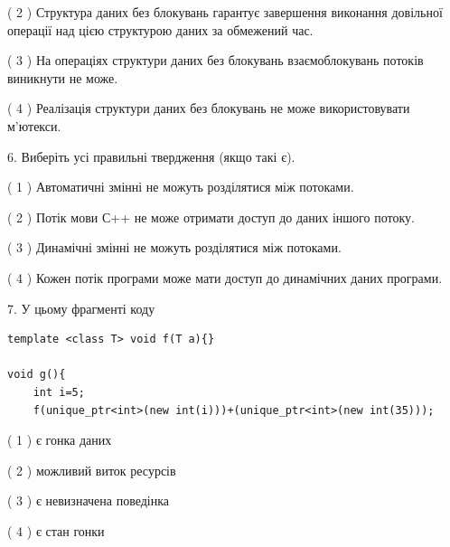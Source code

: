 \documentclass[12pt, ukrainian]{article}
\begin{document}
\begin {large}
{( 2 ) Структура даних без блокувань гарантує завершення виконання довільної операції над цією структурою даних за обмежений час.%

( 3 ) На операціях структури даних без блокувань взаємоблокувань потоків виникнути не може.%

( 4 ) Реалізація структури даних без блокувань не може використовувати м’ютекси.%
\newpage



\vspace{5mm}
6. Виберіть усі правильні твердження (якщо такі є).\par
\vspace{2mm}

( 1 ) Автоматичні змінні не можуть розділятися між потоками.%

( 2 ) Потік мови С++ не може отримати доступ до даних іншого потоку.%

( 3 ) Динамічні змінні не можуть розділятися між потоками.%

( 4 ) Кожен потік програми може мати доступ до динамічних даних програми.%


\vspace{5mm}
7. У цьому фрагменті коду
\begin{verbatim}
template <class T> void f(T a){}

void g(){
    int i=5;
    f(unique_ptr<int>(new int(i)))+(unique_ptr<int>(new int(35)));
\end{verbatim}
( 1 ) є гонка даних%

( 2 ) можливий виток ресурсів%

( 3 ) є невизначена поведінка%

( 4 ) є стан гонки%
}
\end {large}
\end{document}
